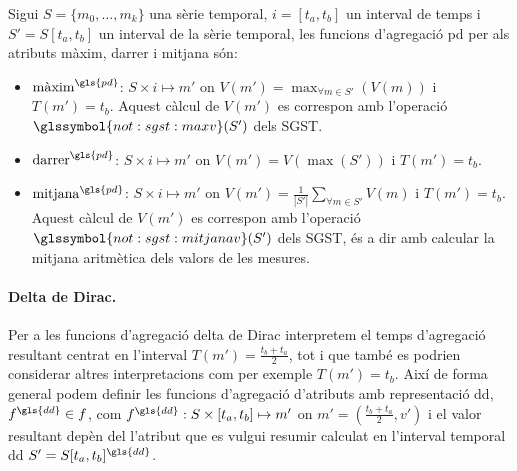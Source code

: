 \begin{definition}
  Sigui $S=\{m_0,\dotsc,m_k\}$ una sèrie temporal, $i=[t_a,t_b]$ un
  interval de temps i $S'=S[t_a,t_b]$ un interval de la sèrie
  temporal, les funcions d'agregació \gls{pd} per als atributs màxim,
  darrer i mitjana són:
  \begin{itemize}

  \item $\operatorname{m\grave{a}xim}^{\gls{pd}}$: $S \times i \mapsto
    m'$ on $V(m') = \max_{\forall m \in S'}(V(m))$ i
    $T(m')=t_b$. Aquest càlcul de $V(m')$ es correspon amb l'operació
    $\glssymbol{not:sgst:maxv}(S')$ dels \gls{SGST}.

\item $\operatorname{darrer}^{\gls{pd}}$: $S \times i \mapsto m'$ on $V(m') =
  V(\max(S'))$ i $T(m')=t_b$.

\item $\operatorname{mitjana}^{\gls{pd}}$: $S \times i \mapsto m'$ on $V(m') =
  \frac{1}{|S'|} \sum\limits_{\forall m\in S'} V(m)$ i $T(m')=t_b$. Aquest càlcul de
  $V(m')$ es correspon amb l'operació $\glssymbol{not:sgst:mitjanav}(S')$
  dels \gls{SGST}, és a dir amb calcular la mitjana aritmètica dels
  valors de les mesures.
\end{itemize}

\end{definition}



\paragraph{Delta de Dirac.} 
Per a les funcions d'agregació delta de Dirac interpretem el temps
d'agregació resultant centrat en l'interval $T(m')=\frac{t_b+t_a}{2}$,
tot i que també es podrien considerar altres interpretacions com per
exemple $T(m')=t_b$. Així de forma general podem definir les funcions
d'agregació d'atributs amb representació \gls{dd}, $f^{\gls{dd}}\in
f$, com $f^{\gls{dd}}: S \times [t_a,t_b] \mapsto m'$ on
$m'=(\frac{t_b+t_a}{2},v')$ i el valor resultant depèn del l'atribut
que es vulgui resumir calculat en l'interval temporal \gls{dd}
$S'=S[t_a,t_b]^{\gls{dd}}$.


